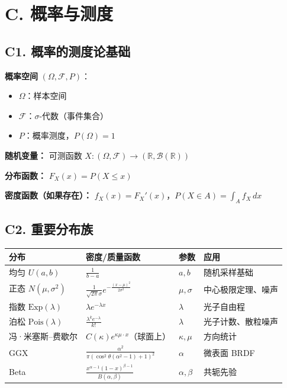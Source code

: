 \section{C. 概率与测度}

\subsection{C1. 概率的测度论基础}

\textbf{概率空间} $(\Omega, \mathcal{F}, P)$：
\begin{itemize}
  \item $\Omega$：样本空间
  \item $\mathcal{F}$：$\sigma$-代数（事件集合）
  \item $P$：概率测度，$P(\Omega) = 1$
\end{itemize}

\textbf{随机变量：} 可测函数 $X: (\Omega, \mathcal{F}) \to (\mathbb{R}, \mathcal{B}(\mathbb{R}))$

\textbf{分布函数：} $F_X(x) = P(X \leq x)$

\textbf{密度函数（如果存在）：} $f_X(x) = F_X'(x)$，$P(X \in A) = \int_A f_X\,dx$

\subsection{C2. 重要分布族}

\begin{center}
\begin{tabular}{L{3cm}L{5cm}L{2cm}L{3.5cm}}
\toprule
\textbf{分布} & \textbf{密度/质量函数} & \textbf{参数} & \textbf{应用} \\
\midrule
均匀 $U(a,b)$ & $\frac{1}{b-a}$ & $a, b$ & 随机采样基础 \\
正态 $N(\mu, \sigma^2)$ & $\frac{1}{\sqrt{2\pi}\sigma}e^{-\frac{(x-\mu)^2}{2\sigma^2}}$ & $\mu, \sigma$ & 中心极限定理、噪声 \\
指数 $\text{Exp}(\lambda)$ & $\lambda e^{-\lambda x}$ & $\lambda$ & 光子自由程 \\
泊松 $\text{Pois}(\lambda)$ & $\frac{\lambda^k e^{-\lambda}}{k!}$ & $\lambda$ & 光子计数、散粒噪声 \\
冯·米塞斯--费歇尔 & $C(\kappa)e^{\kappa \mu \cdot x}$（球面上） & $\kappa, \mu$ & 方向统计 \\
GGX & $\frac{\alpha^2}{\pi(\cos^2\theta(\alpha^2-1)+1)^2}$ & $\alpha$ & 微表面 BRDF \\
Beta & $\frac{x^{\alpha-1}(1-x)^{\beta-1}}{B(\alpha,\beta)}$ & $\alpha, \beta$ & 共轭先验 \\
\bottomrule
\end{tabular}
\end{center}

